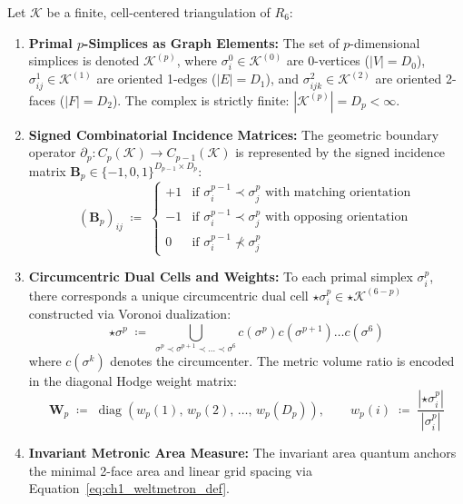 \documentclass[
    12pt,
    a4paper,
    headings=normal,
    twoside=false,
    open=any,
    parskip=half
]{scrbook}
\begin{document}
\begin{physdefinition}\label{def:ch1_primal_dual_mesh}
Let $\mathcal{K}$ be a finite, cell-centered triangulation of $R_6$:
\begin{enumerate}[label=(\alph*), noitemsep]
    \item \textbf{Primal $p$-Simplices as Graph Elements:} The set of $p$-dimensional simplices is denoted $\mathcal{K}^{(p)}$, where $\sigma^0_i \in \mathcal{K}^{(0)}$ are 0-vertices ($|V| = D_0$), $\sigma^1_{ij} \in \mathcal{K}^{(1)}$ are oriented 1-edges ($|E| = D_1$), and $\sigma^2_{ijk} \in \mathcal{K}^{(2)}$ are oriented 2-faces ($|F| = D_2$). The complex is strictly finite: $|\mathcal{K}^{(p)}| = D_p < \infty$.
    \item \textbf{Signed Combinatorial Incidence Matrices:} The geometric boundary operator $\partial_p \colon C_p(\mathcal{K}) \to C_{p-1}(\mathcal{K})$ is represented by the signed incidence matrix $\mathbf{B}_p \in \{-1, 0, 1\}^{D_{p-1} \times D_p}$:
    \begin{equation}
    \left( \mathbf{B}_p \right)_{ij} \;\coloneqq\; \begin{cases}
    +1 & \text{if } \sigma^{p-1}_i \prec \sigma^p_j \text{ with matching orientation} \\
    -1 & \text{if } \sigma^{p-1}_i \prec \sigma^p_j \text{ with opposing orientation} \\
    0 & \text{if } \sigma^{p-1}_i \not\prec \sigma^p_j
    \end{cases}
    \label{eq:ch1_incidence_matrix_def}
    \end{equation}
    \item \textbf{Circumcentric Dual Cells and Weights:} To each primal simplex $\sigma^p_i$, there corresponds a unique circumcentric dual cell $\star\sigma^p_i \in \star\mathcal{K}^{(6-p)}$ constructed via Voronoi dualization:
    \begin{equation}
    \star\sigma^p \;\coloneqq\; \bigcup_{\sigma^p \prec \sigma^{p+1} \prec \dots \prec \sigma^6} c(\sigma^p) c(\sigma^{p+1}) \dots c(\sigma^6)
    \end{equation}
    where $c(\sigma^k)$ denotes the circumcenter. The metric volume ratio is encoded in the diagonal Hodge weight matrix:
    \begin{equation}
    \mathbf{W}_p \;\coloneqq\; \operatorname{diag}\left( w_p(1), \, w_p(2), \, \dots, \, w_p(D_p) \right), \qquad w_p(i) \;\coloneqq\; \frac{\left| \star\sigma^p_i \right|}{\left| \sigma^p_i \right|}
    \label{eq:ch1_hodge_weight_matrix}
    \end{equation}
    \item \textbf{Invariant Metronic Area Measure:} The invariant area quantum anchors the minimal 2-face area and linear grid spacing via Equation~\eqref{eq:ch1_weltmetron_def}.
\end{enumerate}
\end{physdefinition}
\end{document}

